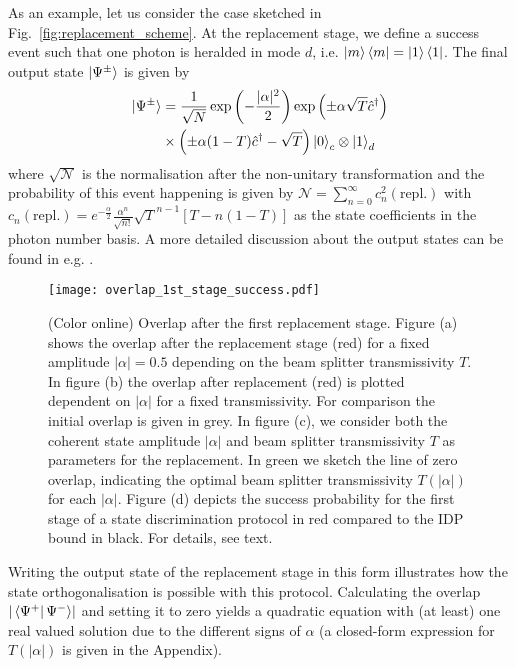 \documentclass[aps,prl,twocolumn, superscriptaddress]{revtex4-1}
\begin{document}
As an example, let us consider the case sketched in Fig.~\ref{fig:replacement_scheme}. At the replacement stage, we define a success event such that one photon is heralded in mode $d$, i.e. $\ket{m}\bra{m}=\ket{1}\bra{1}$. The final output state $\ket{\Psi^\pm}$ is given by
%
\begin{equation}
\begin{aligned}
\ket{\Psi^\pm}&=\frac{1}{\sqrt{N}}\exp\left(-\frac{|\alpha|^2}{2}\right)\exp\left(\pm\alpha\sqrt{T}\hat{c}^\dagger\right) \\
&\times\left(\pm\alpha(1-T)\hat{c}^\dagger-\sqrt{T}\right)\ket{0}_c\otimes\ket{1}_d
\end{aligned}
\end{equation}
%
where $\sqrt{\mathcal{N}}$ is the normalisation after the non-unitary transformation and the probability of this event happening is given by $\mathcal{N}=\sum_{n=0}^\infty c_n^2(\mathrm{repl.})$ with $c_n(\mathrm{repl.})=e^{-\frac{\alpha}{2}}\frac{\alpha^n}{\sqrt{n!}}\sqrt{T}^{n-1}[T-n(1-T)]$ as the state coefficients in the photon number basis. A more detailed discussion about the output states can be found in {e.g.} \cite{lvovsky_quantum-optical_2002, sanaka_filtering_2006, bartley_multiphoton_2012}.
%
\begin{figure}
\texttt{[image: overlap\_1st\_stage\_success.pdf]}
\caption{(Color online) Overlap after the first replacement stage. Figure (a) shows the overlap after the replacement stage (red) for a fixed amplitude $|\alpha|=0.5$ depending on the beam splitter transmissivity $T$. In figure (b) the overlap after replacement (red) is plotted dependent on $|\alpha|$ for a fixed transmissivity. For comparison the initial overlap is given in grey. In figure (c), we consider both the coherent state amplitude $|\alpha|$ and beam splitter transmissivity $T$ as parameters for the replacement. In green we sketch the line of zero overlap, indicating the optimal beam splitter transmissivity $T(|\alpha|)$ for each $|\alpha|$. Figure (d) depicts the success probability for the first stage of a state discrimination protocol in red compared to the IDP bound in black. For details, see text.}
\label{fig:1st_replacement}
\end{figure}
%
Writing the output state of the replacement stage in this form illustrates how the state orthogonalisation is possible with this protocol. Calculating the overlap $|\bra{\Psi^+}\Psi^-\rangle|$ and setting it to zero yields a quadratic equation with (at least) one real valued solution due to the different signs of $\alpha$ (a closed-form expression for $T\left(|\alpha|\right)$ is given in the Appendix).
\end{document}
